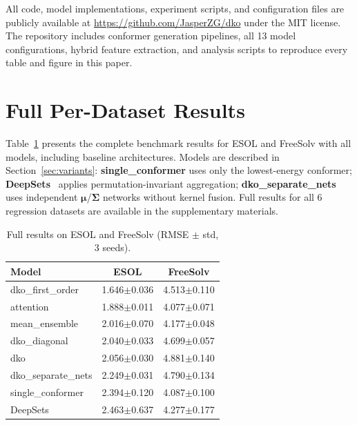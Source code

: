 \documentclass[sigconf]{acmart}
\begin{document}
All code, model implementations, experiment scripts, and configuration files are publicly available at \url{https://github.com/JasperZG/dko} under the MIT license. The repository includes conformer generation pipelines, all 13 model configurations, hybrid feature extraction, and analysis scripts to reproduce every table and figure in this paper.





\clearpage
\appendix
\section{Full Per-Dataset Results}
\label{app:full}

Table~\ref{tab:full_esol} presents the complete benchmark results for ESOL and FreeSolv with all models, including baseline architectures. Models are described in Section~\ref{sec:variants}: \textbf{single\_conformer} uses only the lowest-energy conformer; \textbf{DeepSets}~\cite{zaheer2017deepsets} applies permutation-invariant aggregation; \textbf{dko\_separate\_nets} uses independent $\boldsymbol{\mu}$/$\boldsymbol{\Sigma}$ networks without kernel fusion. Full results for all 6 regression datasets are available in the supplementary materials.

\begin{table}[ht]
\caption{Full results on ESOL and FreeSolv (RMSE $\pm$ std, 3 seeds).}
\label{tab:full_esol}
\centering
\small
\begin{tabular}{@{}lcc@{}}
\toprule
Model & ESOL & FreeSolv \\
\midrule
dko\_first\_order & 1.646$\pm$0.036 & 4.513$\pm$0.110 \\
attention         & 1.888$\pm$0.011 & 4.077$\pm$0.071 \\
mean\_ensemble    & 2.016$\pm$0.070 & 4.177$\pm$0.048 \\
dko\_diagonal     & 2.040$\pm$0.033 & 4.699$\pm$0.057 \\
dko               & 2.056$\pm$0.030 & 4.881$\pm$0.140 \\
dko\_separate\_nets & 2.249$\pm$0.031 & 4.790$\pm$0.134 \\
single\_conformer & 2.394$\pm$0.120 & 4.087$\pm$0.100 \\
DeepSets          & 2.463$\pm$0.637 & 4.277$\pm$0.177 \\
\bottomrule
\end{tabular}
\end{table}
\end{document}
